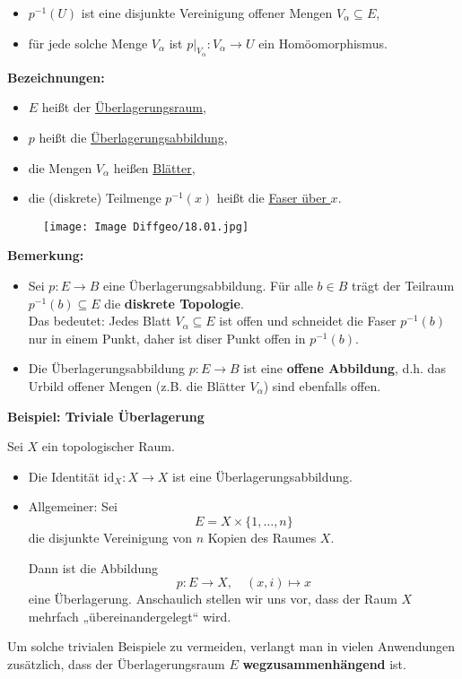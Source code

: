 \documentclass[fleqn, 12pt, letterpaper]{article}
\begin{document}
\begin{itemize}
  \item \( p^{-1}(U) \) ist eine disjunkte Vereinigung offener Mengen \( V_\alpha \subseteq E \),
  \item für jede solche Menge \( V_\alpha \) ist \( p|_{V_\alpha} : V_\alpha \to U \) ein Homöomorphismus.
\end{itemize}

\textbf{Bezeichnungen:}
\begin{itemize}
  \item \( E \) heißt der \underline{Überlagerungsraum},
  \item \( p \) heißt die \underline{Überlagerungsabbildung},
  \item die Mengen \( V_\alpha \) heißen \underline{Blätter},
  \item die (diskrete) Teilmenge \( p^{-1}(x) \) heißt die \underline{Faser über \( x \)}.
\end{itemize}

  \begin{figure}[H]
    \centering
    \texttt{[image: Image Diffgeo/18.01.jpg]}
 \end{figure}

\textbf{Bemerkung:}
\begin{itemize}
  \item Sei \( p : E \to B \) eine Überlagerungsabbildung. Für alle \( b \in B \) trägt der Teilraum \( p^{-1}(b) \subseteq E\) die \textbf{diskrete Topologie}.\\
  Das bedeutet: Jedes Blatt \( V_\alpha \subseteq E \) ist offen und schneidet die Faser \( p^{-1}(b) \) nur in einem Punkt, daher ist diser Punkt offen in $p^{-1}(b)$.

  \item Die Überlagerungsabbildung \( p : E \to B \) ist eine \textbf{offene Abbildung}, d.h. das Urbild offener Mengen (z.B. die Blätter \( V_\alpha \)) sind ebenfalls offen.
\end{itemize}

\textbf{Beispiel: Triviale Überlagerung}

Sei \( X \) ein topologischer Raum.

\begin{itemize}
  \item Die Identität \( \mathrm{id}_X : X \to X \) ist eine Überlagerungsabbildung.

  \item Allgemeiner: Sei
  \[
  E = X \times \{1, \dots, n\}
  \]
  die disjunkte Vereinigung von \( n \) Kopien des Raumes \( X \).

  Dann ist die Abbildung
  \[
  p : E \to X, \quad (x, i) \mapsto x
  \]
  eine Überlagerung. Anschaulich stellen wir uns vor, dass der Raum \( X \) mehrfach „übereinandergelegt“ wird.
\end{itemize}
Um solche trivialen Beispiele zu vermeiden, verlangt man in vielen Anwendungen zusätzlich, dass der Überlagerungsraum \( E \) \textbf{wegzusammenhängend} ist.\\
\end{document}
